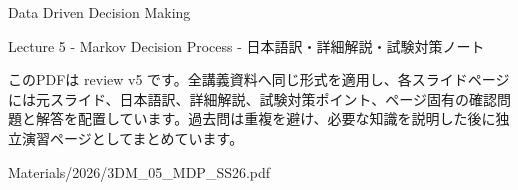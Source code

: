 \documentclass[a4paper,landscape,9pt]{article}
\begin{document}
\begin{titlepage}
\centering
\vspace*{2cm}
{\Huge Data Driven Decision Making\par}
\vspace{0.5cm}
{\Large Lecture 5 - Markov Decision Process - 日本語訳・詳細解説・試験対策ノート\par}
\vspace{1cm}
\begin{minipage}{0.82\textwidth}
このPDFは review v5 です。全講義資料へ同じ形式を適用し、各スライドページには元スライド、日本語訳、詳細解説、試験対策ポイント、ページ固有の確認問題と解答を配置しています。過去問は重複を避け、必要な知識を説明した後に独立演習ページとしてまとめています。
\end{minipage}
\vfill
{\large Materials/2026/3DM\_05\_MDP\_SS26.pdf}
\end{titlepage}
\tableofcontents
\clearpage

\end{document}
